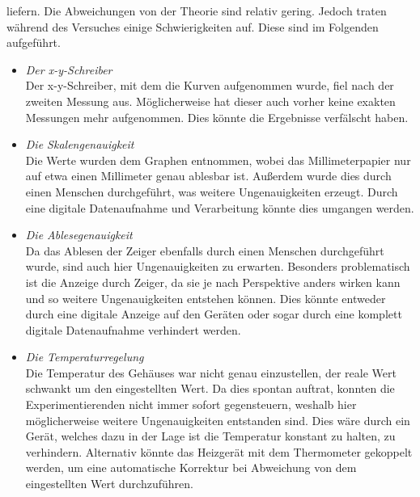 liefern. Die Abweichungen von der Theorie sind relativ gering.
Jedoch traten während des Versuches einige Schwierigkeiten auf. Diese sind im
Folgenden aufgeführt.
\begin{itemize}
  \item \textit{Der x-y-Schreiber} \\
  Der x-y-Schreiber, mit dem die Kurven aufgenommen wurde, fiel nach der zweiten Messung
  aus. Möglicherweise hat dieser auch vorher keine exakten Messungen mehr aufgenommen.
  Dies könnte die Ergebnisse verfälscht haben.
  \item \textit{Die Skalengenauigkeit} \\
  Die Werte wurden dem Graphen entnommen, wobei das Millimeterpapier nur auf etwa
  einen Millimeter genau ablesbar ist. Außerdem wurde dies durch einen Menschen
  durchgeführt, was weitere Ungenauigkeiten erzeugt. Durch eine digitale Datenaufnahme
  und Verarbeitung könnte dies umgangen werden.
  \item \textit{Die Ablesegenauigkeit} \\
  Da das Ablesen der Zeiger ebenfalls durch einen Menschen durchgeführt wurde,
  sind auch hier Ungenauigkeiten zu erwarten. Besonders problematisch ist die Anzeige
  durch Zeiger, da sie je nach Perspektive anders wirken kann und so weitere
  Ungenauigkeiten entstehen können. Dies könnte entweder durch eine digitale Anzeige
  auf den Geräten oder sogar durch eine komplett digitale Datenaufnahme verhindert
  werden.
  \item \textit{Die Temperaturregelung}\\
  Die Temperatur des Gehäuses war nicht genau einzustellen, der reale Wert
  schwankt um den eingestellten Wert. Da dies spontan auftrat, konnten die
  Experimentierenden nicht immer sofort gegensteuern, weshalb hier
  möglicherweise weitere Ungenauigkeiten entstanden sind. Dies wäre durch ein
  Gerät, welches dazu in der Lage ist die Temperatur konstant zu halten, zu
  verhindern. Alternativ könnte das Heizgerät mit dem Thermometer gekoppelt
  werden, um eine automatische Korrektur bei Abweichung von dem eingestellten
  Wert durchzuführen.
\end{itemize}
